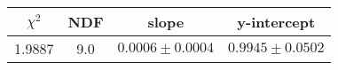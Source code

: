 \begin{tabular}{|c|c|c|c|}

\hline
$\chi^{2}$ & NDF & slope & y-intercept  \\
\hline
1.9887 & 9.0 & $0.0006\pm0.0004$ & $0.9945\pm0.0502$ \\
\hline

\end{tabular}